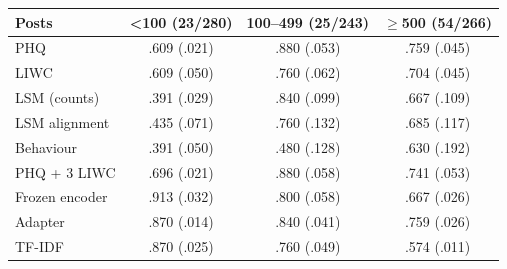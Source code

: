 \begin{tabular}{lccc}
\toprule
Posts & <100 (23/280) & 100--499 (25/243) & $\geq$500 (54/266) \\
\midrule
PHQ & .609 (.021) & .880 (.053) & .759 (.045) \\
LIWC & .609 (.050) & .760 (.062) & .704 (.045) \\
LSM (counts) & .391 (.029) & .840 (.099) & .667 (.109) \\
LSM alignment & .435 (.071) & .760 (.132) & .685 (.117) \\
Behaviour & .391 (.050) & .480 (.128) & .630 (.192) \\
PHQ + 3 LIWC & .696 (.021) & .880 (.058) & .741 (.053) \\
Frozen encoder & .913 (.032) & .800 (.058) & .667 (.026) \\
Adapter & .870 (.014) & .840 (.041) & .759 (.026) \\
TF-IDF & .870 (.025) & .760 (.049) & .574 (.011) \\
\bottomrule
\end{tabular}
